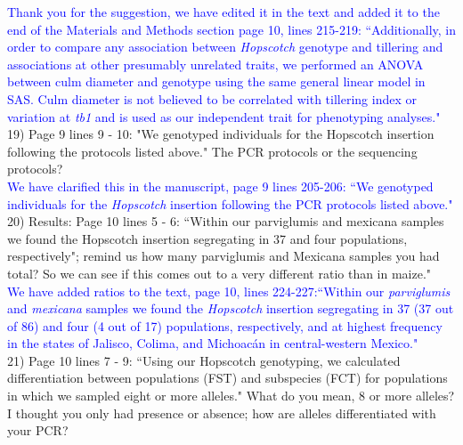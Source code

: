 \documentclass[11pt]{article}
\newcommand{\res}[1]{\noindent \textcolor{blue}{{#1}} \\}
\begin{document}
\res{Thank you for the suggestion, we have edited it in the text and added it to the end of the Materials and Methods section page 10, lines 215-219: ``Additionally, in order to compare any association between \emph{Hopscotch} genotype and tillering and associations at other presumably unrelated traits, we performed an ANOVA between culm diameter and genotype using the same general linear model in SAS. Culm diameter is not believed to be correlated with tillering index or variation at \emph{tb1} and is used as our independent trait for phenotyping analyses."}

19) Page 9 lines 9 - 10: "We genotyped individuals for the Hopscotch insertion following the protocols listed above." The PCR protocols or the sequencing protocols?\\ 

\res{We have clarified this in the manuscript, page 9 lines 205-206: ``We genotyped individuals for the \emph{Hopscotch} insertion following the PCR protocols listed above."}

20) Results:
Page 10 lines 5 - 6: ``Within our parviglumis and mexicana samples we found the Hopscotch insertion segregating in 37 and four populations, respectively"; remind us how many parviglumis and Mexicana samples you had total? So we can see if this comes out to a very different ratio than in maize."\\ 

\res{We have added ratios to the text, page 10, lines 224-227:``Within our \emph{parviglumis} and \emph{mexicana} samples we found the \emph{Hopscotch} insertion segregating in 37 (37 out of 86) and four (4 out of 17) populations, respectively, and at highest frequency in the states of Jalisco, Colima, and Michoac\'{a}n in central-western Mexico."}

21) Page 10 lines 7 - 9: ``Using our Hopscotch genotyping, we calculated diﬀerentiation between populations (FST) and subspecies (FCT) for populations in which we sampled eight or more alleles." What do you mean, 8 or more alleles? I thought you only had presence or absence; how are alleles differentiated with your PCR?\\ 
\end{document}
